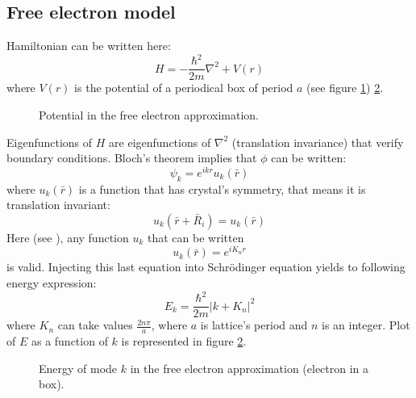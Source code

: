 \documentclass[12pt]{book}
\begin{document}
\subsection{Free electron model}
Hamiltonian can be written\cite{ph:solid:Kittel67,ph:solid:Callaway64}
here: 
\begin{equation}
H=-\frac{\hbar^2}{2m}\nabla^2+V(r)
\end{equation}
where $V(r)$ is the potential of a periodical box of period $a$
(see figure \ref{figpotperioboit})
\ref{figeneeleclib}. 
\begin{figure}[htb]
 \centerline{}   
 \caption{Potential in the free electron approximation.}
 \label{figpotperioboit}
\end{figure}
Eigenfunctions of $H$ are eigenfunctions of $\nabla^2$
(translation invariance) that verify boundary conditions. Bloch's theorem
implies that $\phi$ can be written:
\begin{equation}
\psi_k=e^{ikr}u_k(\bar{r})
\end{equation}
where  $u_k(\bar{r})$ is a function that has crystal's
symmetry, that means it is translation invariant:
\begin{equation}
u_k(\bar{r}+\bar{R}_i)=u_k(\bar{r})
\end{equation}
Here (see \cite{ph:solid:Callaway64}), any function $u_k$ that can be written
\begin{equation}
u_k(\bar{r})=e^{iK_nr}
\end{equation}
is valid. Injecting this last equation into  Schr\"odinger equation yields to
following energy expression: 
\begin{equation}
E_k=\frac{\hbar^2}{2m}|k+K_n|^2
\end{equation}
where $K_n$ can take values $\frac{2n\pi}{a}$, where $a$ is lattice's period
and  $n$ is an integer.
Plot of $E$ as a function of $k$ is represented in figure
\ref{figeneeleclib}. 
\begin{figure}[htb]
 \centerline{}   
 \caption{Energy of mode $k$ in the free electron approximation (electron in a
   box).}
 \label{figeneeleclib}
\end{figure}
\end{document}
